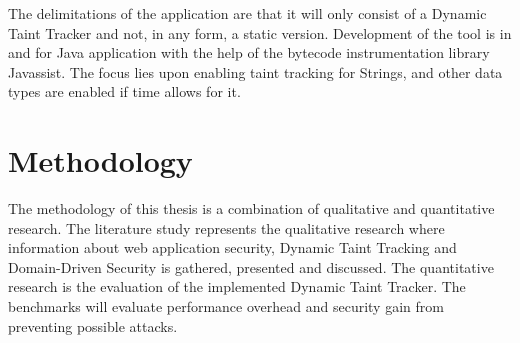 The delimitations of the application are that it will only consist of a Dynamic Taint Tracker and not, in any form, a static version. Development of the tool is in and for Java application with the help of the bytecode instrumentation library Javassist. The focus lies upon enabling taint tracking for Strings, and other data types are enabled if time allows for it.



\section{Methodology}
\label{Methodology}
The methodology of this thesis is a combination of qualitative and quantitative research. The literature study represents the qualitative research where information about web application security, Dynamic Taint Tracking and Domain-Driven Security is gathered, presented and discussed. The quantitative research is the evaluation of the implemented Dynamic Taint Tracker. The benchmarks will evaluate performance overhead and security gain from preventing possible attacks.